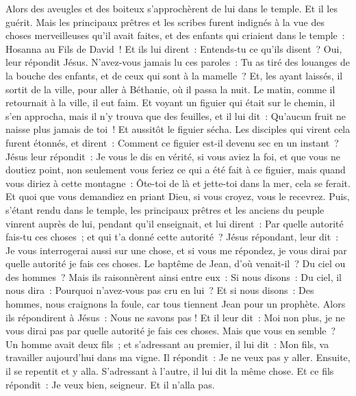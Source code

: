 \begin{multicols}{2}
Alors des aveugles et des boiteux s'approchèrent de lui dans le temple. Et il les guérit.
Mais les principaux prêtres et les scribes furent indignés à la vue des choses merveilleuses qu'il avait faites, et des enfants qui criaient dans le temple~: Hosanna au Fils de David~!
Et ils lui dirent~: Entends-tu ce qu'ils disent~? Oui, leur répondit Jésus. N'avez-vous jamais lu ces paroles~: Tu as tiré des louanges de la bouche des enfants, et de ceux qui sont à la mamelle~?
Et, les ayant laissés, il sortit de la ville, pour aller à Béthanie, où il passa la nuit.
Le matin, comme il retournait à la ville, il eut faim.
Et voyant un figuier qui était sur le chemin, il s'en approcha, mais il n'y trouva que des feuilles, et il lui dit~: Qu'aucun fruit ne naisse plus jamais de toi~! Et aussitôt le figuier sécha.
Les disciples qui virent cela furent étonnés, et dirent~: Comment ce figuier est-il devenu sec en un instant~?
Jésus leur répondit~: Je vous le dis en vérité, si vous aviez la foi, et que vous ne doutiez point, non seulement vous feriez ce qui a été fait à ce figuier, mais quand vous diriez à cette montagne~: Ôte-toi de là et jette-toi dans la mer, cela se ferait.
Et quoi que vous demandiez en priant Dieu, si vous croyez, vous le recevrez.
Puis, s'étant rendu dans le temple, les principaux prêtres et les anciens du peuple vinrent auprès de lui, pendant qu'il enseignait, et lui dirent~: Par quelle autorité fais-tu ces choses~; et qui t'a donné cette autorité~?
Jésus répondant, leur dit~: Je vous interrogerai aussi sur une chose, et si vous me répondez, je vous dirai par quelle autorité je fais ces choses.
Le baptême de Jean, d'où venait-il~? Du ciel ou des hommes~? Mais ils raisonnèrent ainsi entre eux~: Si nous disons~: Du ciel, il nous dira~: Pourquoi n'avez-vous pas cru en lui~?
Et si nous disons~: Des hommes, nous craignons la foule, car tous tiennent Jean pour un prophète.
Alors ils répondirent à Jésus~: Nous ne savons pas ! Et il leur dit~: Moi non plus, je ne vous dirai pas par quelle autorité je fais ces choses.
Mais que vous en semble~? Un homme avait deux fils~; et s'adressant au premier, il lui dit~: Mon fils, va travailler aujourd'hui dans ma vigne.
Il répondit~: Je ne veux pas y aller. Ensuite, il se repentit et y alla.
S'adressant à l'autre, il lui dit la même chose. Et ce fils répondit~: Je veux bien, seigneur. Et il n'alla pas.

\end{multicols}

